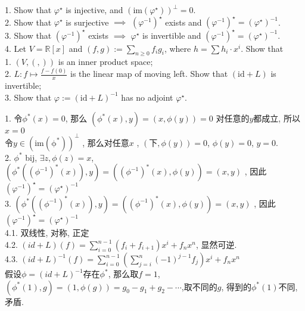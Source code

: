 \documentclass[11pt]{ctexart}
\theoremstyle{definition}
\numberwithin{equation}{section}
\newcommand{\op}[1]{\operatorname{#1}}%
\theoremstyle{definition}
\theoremstyle{remark}
\begin{document}
1. Show that $\varphi^\star$ is injective, and $(\mathrm{im}(\varphi ^\star))^\perp = 0$.\\
2. Show that $\varphi^\star$ is surjective $\implies$ $(\varphi^{-1})^\star$ exists and $(\varphi ^{-1})^\star = (\varphi^\star)^{-1}$.\\
3. Show that $(\varphi^{-1})^\star$ exists $\implies$ $\varphi^\star$ is invertible and $(\varphi ^{-1})^\star = (\varphi^\star)^{-1}$.\\
4. Let $V = \mathbb R[x]$ and $(f,g) := \sum_{n \geq 0}f_i g_i$, where $h = \sum h_i\cdot x^i$. Show that\\
   1. $(V, (,))$ is an inner product space;\\
   2. $L : f \mapsto \frac{f-f(0)}{x}$ is the linear map of moving left. Show that $(\mathrm{id}+L)$ is invertible;\\
   3. Show that $\varphi := (\mathrm{id}+L)^{-1}$ has no adjoint $\varphi^\star$.
\begin{aaa}
    1. 令$\phi^*(x)=0$, 那么 $(\phi^*(x),y) = (x , \phi(y)) =0 $ 对任意的$y$都成立, 所以$x=0$\\令$y\in (\op{im(\phi^*)})^{\perp}$ , 那么对任意$x$ , $(下, \phi(y))=0$, $\phi(y) = 0 $, $y = 0$.\\ 
    2. $\phi^*$ bij, $\exists z, \phi(z)=x$, $(\phi^*((\phi^{-1})^{*}(x)),y)=((\phi^{-1})^{*}(x),\phi(y))=(x,y)$ , 因此 $(\varphi ^{-1})^\star = (\varphi^\star)^{-1}$\\
    3. $(\phi^*((\phi^{-1})^{*}(x)),y)=((\phi^{-1})^{*}(x),\phi(y))=(x,y)$ , 因此 $(\varphi ^{-1})^\star = (\varphi^\star)^{-1}$\\
    4.1. 双线性, 对称, 正定\\
    4.2. $(id+L)(f)=\sum_{i=0}^{n-1} (f_i+f_{i+1})x^i+f_nx^n$, 显然可逆.\\
    4.3. $(id+L)^{-1}(f)=\sum_{i=0}^{n-1}(\sum_{j=i}^n(-1)^{j-1}f_j)x^i+f_nx^n$\\
    假设$\phi=(id+L)^{-1}$存在$\phi^*$, 那么取$f=1$, $(\phi^*(1),g)=(1,\phi(g))=g_0-g_1+g_2-\cdots$,取不同的$g$, 得到的$\phi^*(1)$不同, 矛盾.
\end{aaa}
\end{document}
